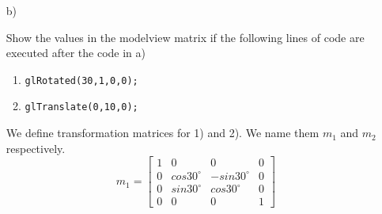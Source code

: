 \begin{itemize}
    \item[b)] {
        Show the values in the modelview matrix if the following lines of code are executed after the code in a)
        \begin{enumerate}
            \item \texttt{glRotated(30,1,0,0);}
            \item \texttt{glTranslate(0,10,0);}
        \end{enumerate}
        We define transformation matrices for 1) and 2). We name them $m_1$ and $m_2$ respectively.
        \begin{equation}
            m_1 = \begin{bmatrix}
                   1 & 0 & 0 & 0\\
                   0 & cos30^\circ & -sin30^\circ & 0\\
                   0 & sin30^\circ & cos30^\circ & 0\\
                   0 & 0 & 0 & 1
                   \end{bmatrix}
            \label{eq:trans1}
        \end{equation}
        
}
\end{itemize}
